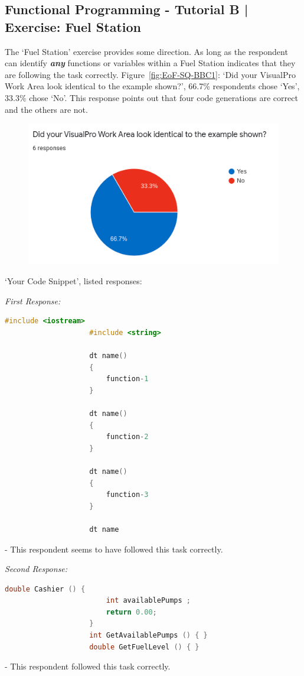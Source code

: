 \documentclass[12pt]{report} %
\begin{document}
			\subsection{Functional Programming - Tutorial B | Exercise: Fuel Station}
				The `Fuel Station' exercise provides some direction. As long as the respondent can identify \textbf{\textit{any}} functions or variables within a Fuel Station indicates that they are following the task correctly. Figure~\ref{fig:EoF-SQ-BBC1}: `Did your VisualPro Work Area look identical to the example shown?', 66.7\% respondents chose `Yes', 33.3\% chose `No'. This response points out that four code generations are correct and the others are not.
				
				\begin{figure}[H]
					{\includegraphics[scale=0.50]{Figures/VisualPro-Survey_Results/SQ-BBC1.png}}
				\end{figure}

				`Your Code Snippet', listed responses:

				\textit{First Response:}
				\begin{lstlisting}[language=c++]
					#include <iostream>
					#include <string>

					dt name()
					{
						function-1
					}

					dt name()
					{
						function-2
					}

					dt name()
					{
						function-3
					}

					dt name
				\end{lstlisting} - This respondent seems to have followed this task correctly.

				\textit{Second Response:}
				\begin{lstlisting}[language=c++]
					double Cashier () {
						int availablePumps ;
						return 0.00;
					}
					int GetAvailablePumps () { }
					double GetFuelLevel () { }
				\end{lstlisting} - This respondent followed this task correctly.
\end{document}
